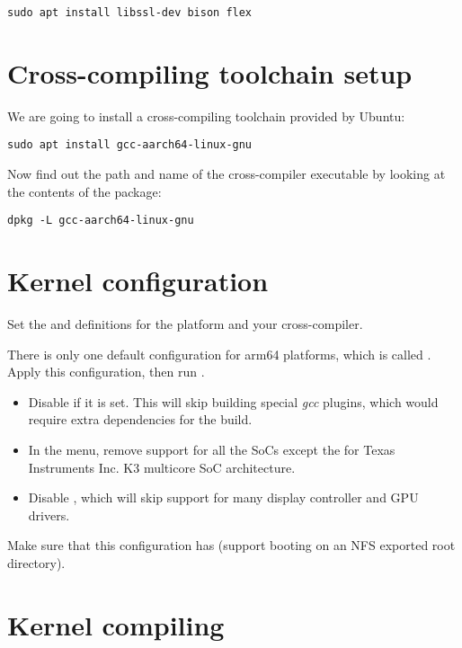 \begin{verbatim}
sudo apt install libssl-dev bison flex
\end{verbatim}

\section{Cross-compiling toolchain setup}

We are going to install a cross-compiling toolchain provided by Ubuntu:

\begin{verbatim}
sudo apt install gcc-aarch64-linux-gnu
\end{verbatim}

Now find out the path and name of the cross-compiler executable by looking at the contents of the package:

\begin{verbatim}
dpkg -L gcc-aarch64-linux-gnu
\end{verbatim}

\section{Kernel configuration}

Set the  and  definitions for the 
platform and your cross-compiler.

There is only one default configuration for arm64 platforms, which is called
. Apply this configuration, then run .

\begin{itemize}
\item Disable  if it is set. This will skip
  building special {\em gcc} plugins, which would require extra dependencies
  for the build.
\item In the  menu, remove support for all the SoCs except
the for Texas Instruments Inc. K3 multicore SoC architecture.
\item Disable , which will skip support for many display
controller and GPU drivers.
\end{itemize}

Make sure that this configuration has  (support
booting on an NFS exported root directory).

\section{Kernel compiling}

